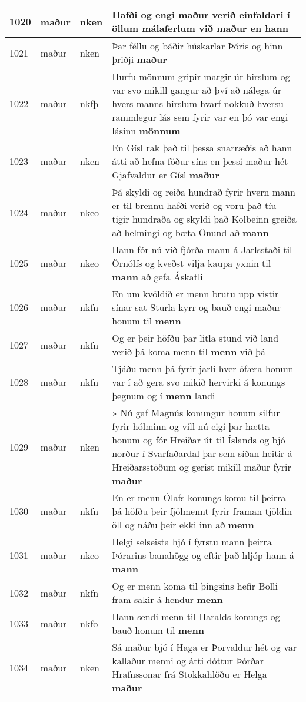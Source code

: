 \documentclass{article}
\begin{document}
\begin{longtable}{p{1cm}|p{1cm}|p{1cm}|p{13cm}}
\hline
1020&maður&nken&Hafði og engi maður verið einfaldari í öllum málaferlum við \textbf{maður} en hann\\
\hline
1021&maður&nken&Þar féllu og báðir húskarlar Þóris og hinn þriðji \textbf{maður} \\
\hline
1022&maður&nkfþ&Hurfu mönnum gripir margir úr hirslum og var svo mikill gangur að því að nálega úr hvers manns hirslum hvarf nokkuð hversu rammlegur lás sem fyrir var en þó var engi lásinn \textbf{mönnum} \\
\hline
1023&maður&nken&En Gísl rak það til þessa snarræðis að hann átti að hefna föður síns en þessi maður hét Gjafvaldur er Gísl \textbf{maður} \\
\hline
1024&maður&nkeo&Þá skyldi og reiða hundrað fyrir hvern mann er til brennu hafði verið og voru það tíu tigir hundraða og skyldi það Kolbeinn greiða að helmingi og bæta Önund að \textbf{mann} \\
\hline
1025&maður&nkeo&Hann fór nú við fjórða mann á Jarlsstaði til Örnólfs og kveðst vilja kaupa yxnin til \textbf{mann} að gefa Áskatli\\
\hline
1026&maður&nkfn&En um kvöldið er menn brutu upp vistir sínar sat Sturla kyrr og bauð engi maður honum til \textbf{menn} \\
\hline
1027&maður&nkfn&Og er þeir höfðu þar litla stund við land verið þá koma menn til \textbf{menn} við þá\\
\hline
1028&maður&nkfn&Tjáðu menn þá fyrir jarli hver ófæra honum var í að gera svo mikið hervirki á konungs þegnum og í \textbf{menn} landi\\
\hline
1029&maður&nken&» Nú gaf Magnús konungur honum silfur fyrir hólminn og vill nú eigi þar hætta honum og fór Hreiðar út til Íslands og bjó norður í Svarfaðardal þar sem síðan heitir á Hreiðarsstöðum og gerist mikill maður fyrir \textbf{maður} \\
\hline
1030&maður&nkfn&En er menn Ólafs konungs komu til þeirra þá höfðu þeir fjölmennt fyrir framan tjöldin öll og náðu þeir ekki inn að \textbf{menn} \\
\hline
1031&maður&nkeo&Helgi selseista hjó í fyrstu mann þeirra Þórarins banahögg og eftir það hljóp hann á \textbf{mann} \\
\hline
1032&maður&nkfn&Og er menn koma til þingsins hefir Bolli fram sakir á hendur \textbf{menn} \\
\hline
1033&maður&nkfo&Hann sendi menn til Haralds konungs og bauð honum til \textbf{menn} \\
\hline
1034&maður&nken&Sá maður bjó í Haga er Þorvaldur hét og var kallaður menni og átti dóttur Þórðar Hrafnssonar frá Stokkahlöðu er Helga \textbf{maður} \\

\end{longtable}
\end{document}
